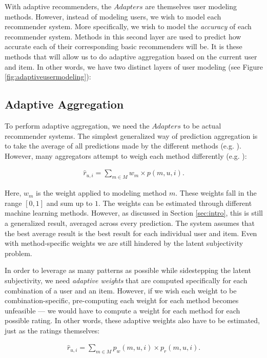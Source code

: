 With adaptive recommenders, the $Adapters$ are themselves user modeling methods.
However, instead of modeling users, we wish to model each recommender system.
More specifically, we wish to model the \emph{accuracy} of each recommender system.
Methods in this second layer are used to predict how accurate each of their corresponding basic recommenders will be.
It is these methods that will allow us to do adaptive aggregation based on the current user and item.
In other words, we have two distinct layers of user modeling 
(see Figure \ref{fig:adaptiveusermodeling}):



\subsection{Adaptive Aggregation}

To perform adaptive aggregation, we need the $Adapters$ to be actual recommender systems.
The simplest generalized way of prediction aggregation is to take the average of all predictions made
by the different methods (e.g. \cite[p3]{Aslam2001}).
However, many aggregators attempt to weigh each method differently (e.g. \cite{Claypool1999}):

\begin{eqnarray*}
  \hat{r}_{u,i} = \sum_{m \in M} w_{m} \times p(m,u,i).
\end{eqnarray*}

Here, $w_m$ is the weight applied to modeling method $m$. 
These weights fall in the range $[0,1]$ and sum up to $1$.
The weights can be estimated through different machine learning methods.
However, as discussed in Section \ref{sec:intro},
this is still a generalized result, averaged across every prediction.
The system assumes that the best average result is the best result for each individual user and item.
Even with method-specific weights we are still hindered by the latent subjectivity problem.

In order to leverage as many patterns as possible while sidestepping the latent subjectivity,
we need \emph{adaptive weights} that are computed specifically for each combination of a user and an item.
However, if we wish each weight to be combination-specific, pre-computing each weight for each method becomes unfeasible
--- we would have to compute a weight for each method for each possible rating.
In other words, these adaptive weights also have to be estimated, just as the ratings themselves:

\begin{eqnarray*}
  \hat{r}_{u,i} = \sum_{m \in M} p_{w}(m,u,i) \times p_{r}(m,u,i).
\end{eqnarray*}

